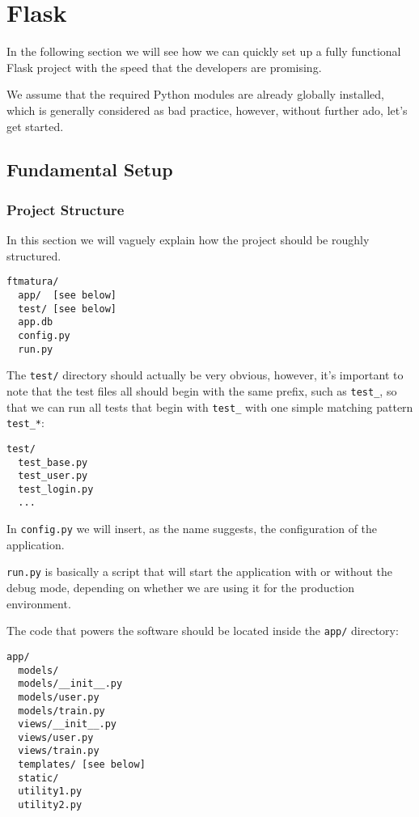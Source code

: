 \documentclass[../main/main.tex]{subfiles}
\begin{document}
\section{Flask}  

In the following section we will see how we can quickly set up a fully
functional Flask project with the speed that the developers are
promising.

We assume that the required Python modules are already globally
installed, which is generally considered as bad practice, however,
without further ado, let's get started.

\subsection{Fundamental Setup}

\subsubsection{Project Structure}

In this section we will vaguely explain how the project should be
roughly structured.

\begin{lstlisting}
ftmatura/
  app/  [see below]
  test/ [see below]
  app.db
  config.py
  run.py
\end{lstlisting}

The \lstinline|test/| directory should actually be very obvious,
however, it's important to note that the test files all should begin
with the same prefix, such as \lstinline|test_|, so that we can run
all tests that begin with \lstinline|test_| with one simple matching
pattern \lstinline|test_*|: 

\begin{lstlisting}
test/
  test_base.py
  test_user.py
  test_login.py
  ...
\end{lstlisting}

In \lstinline|config.py| we will insert, as the name suggests, the
configuration of the application. 

\lstinline|run.py| is basically a script that will start the
application with or without the debug mode, depending on whether we are using
it for the production environment. 

The code that powers the software should be located inside the \lstinline|app/|
directory:

\begin{lstlisting}
app/
  models/
  models/__init__.py
  models/user.py
  models/train.py
  views/__init__.py
  views/user.py
  views/train.py
  templates/ [see below]
  static/ 
  utility1.py
  utility2.py
\end{lstlisting}
\end{document}
